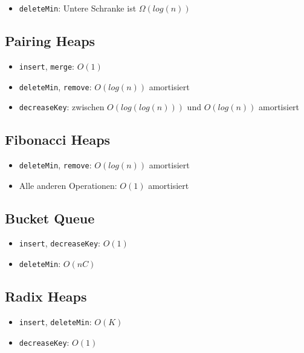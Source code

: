 \documentclass[10pt,a4paper]{article}
\begin{document}
	\begin{itemize}
		\item \texttt{deleteMin}: Untere Schranke ist $\Omega(log (n))$
	\end{itemize}

	\subsection{Pairing Heaps}
	\label{lz:sub:pairing_heaps}
	
	\begin{itemize}
		\item \texttt{insert}, \texttt{merge}: $O(1)$
		\item \texttt{deleteMin}, \texttt{remove}: $O(log (n))$ amortisiert
		\item \texttt{decreaseKey}: zwischen $O(log (log (n)))$ und $O(log (n))$ amortisiert
	\end{itemize}
	
	\subsection{Fibonacci Heaps}
	\label{lz:sub:fibonacci_heaps}
	
	\begin{itemize}
		\item \texttt{deleteMin}, \texttt{remove}: $O(log (n))$ amortisiert
		\item Alle anderen Operationen: $O(1)$ amortisiert
	\end{itemize}

	\subsection{Bucket Queue}
	\label{lz:sub:bucket_queue}
	
	\begin{itemize}
		\item \texttt{insert}, \texttt{decreaseKey}: $O(1)$
		\item \texttt{deleteMin}: $O(nC)$
	\end{itemize}

	\subsection{Radix Heaps}
	\label{lz:sub:radix_heaps}
	
	\begin{itemize}
		\item \texttt{insert}, \texttt{deleteMin}: $O(K)$
		\item \texttt{decreaseKey}: $O(1)$
	\end{itemize}
\end{document}
